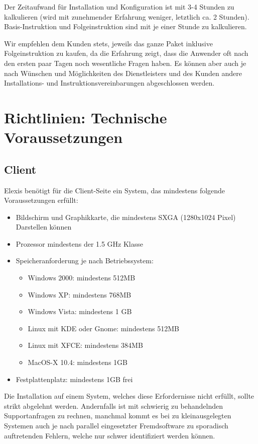 \documentclass[paper=a4,BCOR8.25mm,twoside]{scrartcl}
\begin{document}
Der Zeitaufwand für Installation und Konfiguration ist mit 3-4 Stunden zu kalkulieren (wird mit zunehmender Erfahrung weniger, letztlich ca. 2 Stunden). Basis-Instruktion und Folgeinstruktion sind mit je einer Stunde zu kalkulieren.

Wir empfehlen dem Kunden stets, jeweils das ganze Paket inklusive Folgeinstruktion zu kaufen, da die Erfahrung zeigt, dass die Anwender oft nach den ersten paar Tagen noch wesentliche Fragen haben. Es können aber auch je nach Wünschen und Möglichkeiten des Dienstleisters und des Kunden andere Installations- und Instruktionsvereinbarungen abgeschlossen werden.

\section{Richtlinien: Technische Voraussetzungen}
\label{voraussetzungen}
\subsection{Client}
Elexis benötigt für die Client-Seite ein System, das mindestens folgende Voraussetzungen erfüllt:
\begin{itemize}
    \item Bildschirm und Graphikkarte, die mindestens SXGA (1280x1024 Pixel) Darstellen können
    \item Prozessor mindestens der 1.5 GHz Klasse
    \item Speicheranforderung je nach Betriebssystem:
    \begin{itemize}
        \item Windows 2000:     mindestens 512MB
        \item Windows XP:       mindestens 768MB
        \item Windows Vista:    mindestens 1 GB
        \item Linux mit KDE oder Gnome: mindestens 512MB
        \item Linux mit XFCE:   mindestens 384MB
        \item MacOS-X 10.4:     mindestens 1GB
    \end{itemize}
    \item Festplattenplatz: mindestens 1GB frei
\end{itemize}
Die Installation auf einem System, welches diese Erfordernisse nicht erfüllt, sollte strikt abgelehnt werden. Andernfalls ist mit schwierig zu behandelnden Supportanfragen zu rechnen, manchmal kommt es bei \glqq zu klein\grqq ausgelegten Systemen auch je nach parallel eingesetzter Fremdsoftware zu sporadisch auftretenden Fehlern, welche nur schwer identifiziert werden können. 
\end{document}
